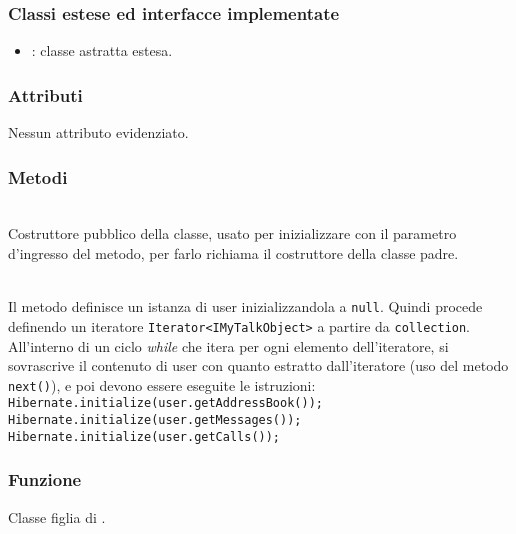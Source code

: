 \subsubsection*{Classi estese ed interfacce implementate}

\begin{itemize}
	\item {}: classe astratta estesa.
\end{itemize}

\subsubsection*{Attributi}

Nessun attributo evidenziato.

\subsubsection*{Metodi}

\begin{description}
	\item{}\\
	Costruttore pubblico della classe, usato per inizializzare  con il parametro d'ingresso del metodo, per farlo richiama il costruttore della classe padre.

	\item{}\\
	Il metodo definisce un istanza di  user inizializzandola a \texttt{null}. Quindi procede definendo un iteratore \texttt{Iterator<IMyTalkObject>} a partire da \texttt{collection}. All'interno di un ciclo \textit{while} che itera per ogni elemento dell'iteratore, si sovrascrive il contenuto di user con quanto estratto dall'iteratore (uso del metodo \texttt{next()}), e poi devono essere eseguite le istruzioni:\\
	
	\verb|Hibernate.initialize(user.getAddressBook());|\\
	\verb|Hibernate.initialize(user.getMessages());|\\
	\verb|Hibernate.initialize(user.getCalls());|

\end{description}


\subsubsection*{Funzione}
Classe figlia di .

